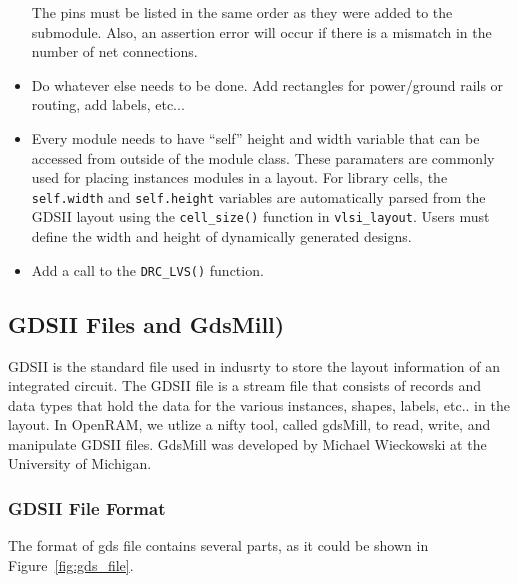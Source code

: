 \begin{itemize}
  The pins must be listed in the same order as they were added to the
  submodule.  Also, an assertion error will occur if there is a
  mismatch in the number of net connections.
\item Do whatever else needs to be done. Add rectangles for
  power/ground rails or routing, add labels, etc...
\item Every module needs to have ``self'' height and width variable
  that can be accessed from outside of the module class.  These
  paramaters are commonly used for placing instances modules in a
  layout.  For library cells, the \verb|self.width| and
  \verb|self.height| variables are automatically parsed from the GDSII
  layout using the \verb|cell_size()| function in \verb|vlsi_layout|.
  Users must define the width and height of dynamically generated
  designs.
\item Add a call to the \verb|DRC_LVS()| function.
\end{itemize}

\subsection{GDSII Files and GdsMill)}
\label{sec:gds}

GDSII is the standard file used in indusrty to store the layout
information of an integrated circuit. The GDSII file is a stream file
that consists of records and data types that hold the data for the
various instances, shapes, labels, etc.. in the layout. In OpenRAM, we
utlize a nifty tool, called gdsMill, to read, write, and manipulate
GDSII files.  GdsMill was developed by Michael Wieckowski at the
University of Michigan.

\subsubsection{GDSII File Format}
\label{sec:format}

The format of gds file contains several parts, as it could be shown in
Figure~\ref{fig:gds_file}.

